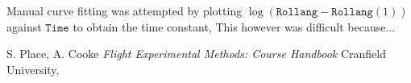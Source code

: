 \documentclass{article}
\begin{document}
Manual curve fitting was attempted by plotting $\log(\texttt{Rollang} - \texttt{Rollang}(1))$ against $\texttt{Time}$ to obtain the time constant,
This however was difficult because...


\begin{thebibliography}{9}

  S. Place, A. Cooke
  \emph{Flight Experimental Methods: Course Handbook}
  Cranfield University,

\end{thebibliography}
\end{document}
